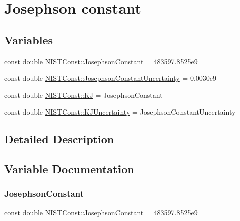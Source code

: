 \hypertarget{group___josephson_constant}{}\section{Josephson constant}
\label{group___josephson_constant}
\subsection*{Variables}
\begin{DoxyCompactItemize}
\item 
const double \hyperlink{group___josephson_constant_gae9f3553a6a6c5eed3df61ad33277cab8}{N\+I\+S\+T\+Const\+::\+Josephson\+Constant} = 483597.\+8525e9
\item 
const double \hyperlink{group___josephson_constant_gaa10eadf7c1811f94c5b5725ad300a099}{N\+I\+S\+T\+Const\+::\+Josephson\+Constant\+Uncertainty} = 0.\+0030e9
\item 
const double \hyperlink{group___josephson_constant_ga75e8a1fd7b1434083e96c2f0291eb756}{N\+I\+S\+T\+Const\+::\+KJ} = Josephson\+Constant
\item 
const double \hyperlink{group___josephson_constant_ga8501536b42a3f29278ec30b3bf054321}{N\+I\+S\+T\+Const\+::\+K\+J\+Uncertainty} = Josephson\+Constant\+Uncertainty
\end{DoxyCompactItemize}


\subsection{Detailed Description}


\subsection{Variable Documentation}
\mbox{\label{group___josephson_constant_gae9f3553a6a6c5eed3df61ad33277cab8}} 
\subsubsection{\texorpdfstring{Josephson\+Constant}{JosephsonConstant}}
{\footnotesize\ttfamily const double N\+I\+S\+T\+Const\+::\+Josephson\+Constant = 483597.\+8525e9}

